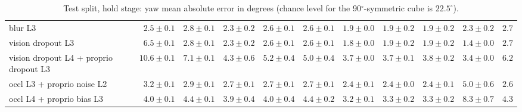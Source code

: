 \begin{table}[p]
{\begin{tabular}{lrrrrrrrrrr}
blur L3 & $2.5{\pm}0.1$ & $2.8{\pm}0.1$ & $2.3{\pm}0.2$ & $2.6{\pm}0.1$ & $2.6{\pm}0.1$ & $1.9{\pm}0.0$ & $1.9{\pm}0.2$ & $1.9{\pm}0.2$ & $2.3{\pm}0.2$ & $2.7$ \\
vision dropout L3 & $6.5{\pm}0.1$ & $2.8{\pm}0.1$ & $2.3{\pm}0.2$ & $2.6{\pm}0.1$ & $2.6{\pm}0.1$ & $1.8{\pm}0.0$ & $1.9{\pm}0.2$ & $1.9{\pm}0.2$ & $1.4{\pm}0.0$ & $2.7$ \\
vision dropout L4 {+} proprio dropout L3 & $10.6{\pm}0.1$ & $7.1{\pm}0.1$ & $4.3{\pm}0.6$ & $5.2{\pm}0.4$ & $5.0{\pm}0.4$ & $3.7{\pm}0.0$ & $3.7{\pm}0.1$ & $3.8{\pm}0.2$ & $3.4{\pm}0.0$ & $6.2$ \\
occl L3 {+} proprio noise L2 & $3.2{\pm}0.1$ & $2.9{\pm}0.1$ & $2.7{\pm}0.1$ & $2.7{\pm}0.1$ & $2.7{\pm}0.1$ & $2.4{\pm}0.1$ & $2.4{\pm}0.0$ & $2.4{\pm}0.1$ & $5.0{\pm}0.6$ & $2.6$ \\
occl L4 {+} proprio bias L3 & $4.0{\pm}0.1$ & $4.4{\pm}0.1$ & $3.9{\pm}0.4$ & $4.0{\pm}0.4$ & $4.4{\pm}0.2$ & $3.2{\pm}0.1$ & $3.3{\pm}0.2$ & $3.3{\pm}0.2$ & $8.3{\pm}0.7$ & $4.3$ \\
\bottomrule\end{tabular}}
\caption{Test split, hold stage: yaw mean absolute error in degrees (chance level for the 90$^\circ$-symmetric cube is $22.5^\circ$).}\label{tab:app_yaw}\end{table}
